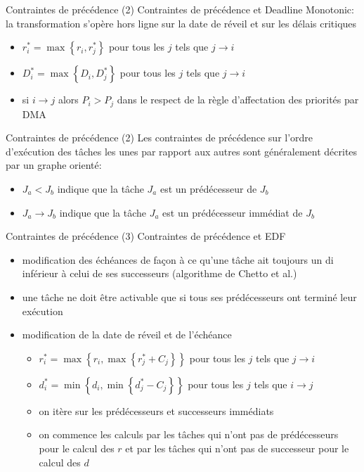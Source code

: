 \begin{frame}{Contraintes de précédence (2)} 
  Contraintes de  précédence et Deadline  Monotonic: la transformation
  s'opère hors ligne sur la date de réveil et sur les délais critiques
  \begin{itemize}
  \item $r^*_i =  \max \left\{ r_i, r^*_j \right\}$  pour tous les $j$
    tels que $j → i$
  \item $D^*_i =  \max \left\{ D_i, D^*_j \right\}$  pour tous les $j$
    tels que $j → i$
  \item  si $i  →  j$  alors $P_i  >  P_j$ dans  le
    respect de la règle d'affectation des priorités par DMA
  \end{itemize} 
\end{frame} 

\begin{frame}{Contraintes de précédence (2)} 
  Les contraintes de précédence sur l'ordre d'exécution des tâches les
  unes par rapport aux autres sont généralement décrites par un graphe
  orienté:
  \begin{itemize}
  \item $J_a < J_b$ indique que  la tâche $J_a$ est un prédécesseur de
    $J_b$
  \item $J_a  → J_b$  indique que la  tâche $J_a$ est  un prédécesseur
    immédiat de $J_b$
  \end{itemize}
 \end{frame}

\begin{frame}{Contraintes de précédence (3)} 
  Contraintes de précédence et EDF
  \begin{itemize}
  \item  modification des  échéances de  façon à  ce qu'une  tâche ait
    toujours un di inférieur à celui de ses successeurs (algorithme de
    Chetto et al.)
  \item une tâche ne doit être activable que si tous ses prédécesseurs
    ont terminé leur exécution
  \item modification de la date de réveil et de l'échéance
    \begin{itemize}
    \item $r^*_i = \max \left\{ r_i, \max \left\{ r^*_j + C_j \right\}
      \right\}$ pour tous les $j$ tels que $j → i$
    \item $d^*_i = \min \left\{ d_i, \min \left\{ d^*_j - C_j \right\}
      \right\}$ pour tous les $j$ tels que $i → j$
    \item on itère sur les prédécesseurs et successeurs immédiats
    \item  on commence les  calculs par  les tâches  qui n'ont  pas de
      prédécesseurs pour le calcul des $r$ et par les tâches qui n'ont
      pas de successeur pour le calcul des $d$
    \end{itemize}
  \end{itemize}
\end{frame}

